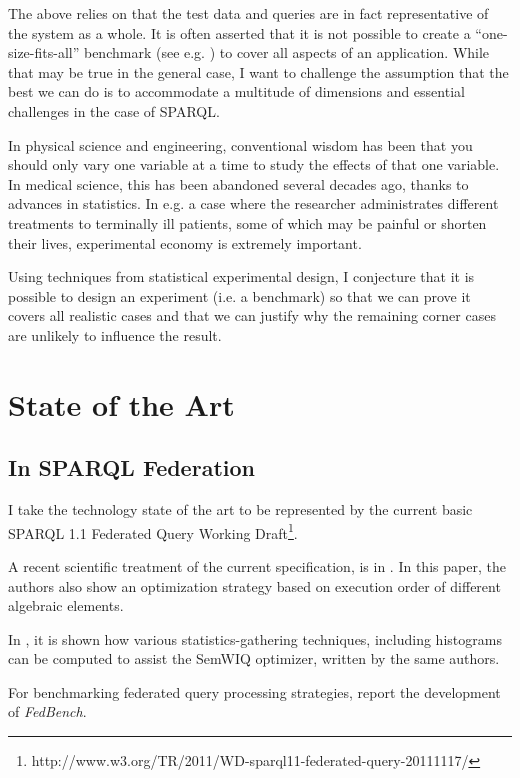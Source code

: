 \documentclass{llncs}
\begin{document}
The above relies on that the test data and queries are in fact
representative of the system as a whole. It is often asserted that it
is not possible to create a ``one-size-fits-all'' benchmark (see
e.g. \cite{Schmidt:2011:FBS:2063016.2063054}) to cover all aspects of
an application. While that may be true in the general case, I want to
challenge the assumption that the best we can do is to accommodate a
multitude of dimensions and essential challenges in the case of
SPARQL.

In physical science and engineering, conventional wisdom has been that
you should only vary one variable at a time to study the effects of
that one variable. In medical science, this has been abandoned several
decades ago, thanks to advances in statistics. In e.g. a case where
the researcher administrates different treatments to terminally ill
patients, some of which may be painful or shorten their lives,
experimental economy is extremely important.

Using techniques from statistical experimental design, I conjecture
that it is possible to design an experiment (i.e. a benchmark) so that
we can prove it covers all realistic cases and that we can justify
why the remaining corner cases are unlikely to influence the result.


\section{State of the Art}

\subsection{In SPARQL Federation}

I take the technology state of the art to be represented by the
current basic SPARQL 1.1 Federated Query Working
Draft\footnote{http://www.w3.org/TR/2011/WD-sparql11-federated-query-20111117/}. 

A recent scientific treatment of the current specification, is in
\cite{springerlink:10.1007/978-3-642-21064-8_1}. In this paper, the
authors also show an optimization strategy based on execution order of
different algebraic elements. %

In \cite{5337556}, it is shown how various statistics-gathering
techniques, including histograms can be computed to
assist the SemWIQ optimizer, written by the same authors.

For benchmarking federated query processing strategies,
\cite{Schmidt:2011:FBS:2063016.2063054} report the development of \emph{FedBench}.
\end{document}
